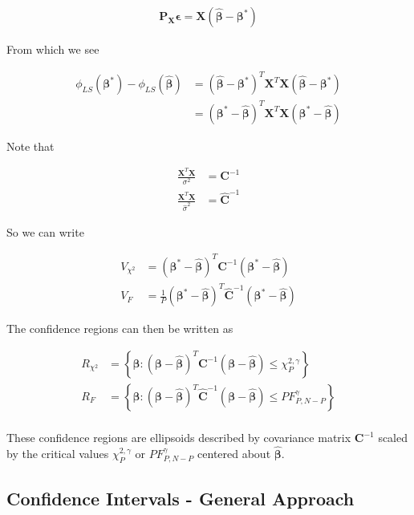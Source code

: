 \documentclass[12pt]{article}
\newcommand{\ep}{\epsilon}
\newcommand{\bv}[1]{\boldsymbol{#1}}
\begin{document}
\begin{align}
\bv{P_X}\bv{\ep} = \bv{X}(\bv{\hat{\beta}} - \bv{\beta^*})
\end{align}

From which we see

\begin{align}
\phi_{LS}(\bv{\beta^*}) - \phi_{LS}(\bv{\hat{\beta}})  &= \left(\bv{\hat{\beta}} - \bv{\beta^*}\right)^T \bv{X}^T\bv{X} \left(\bv{\hat{\beta}} - \bv{\beta^*}\right)\\
&=\left(\bv{\beta^*} - \bv{\hat{\beta}}\right)^T \bv{X}^T\bv{X} \left(\bv{\beta^*} - \bv{\hat{\beta}}\right)
\end{align}

Note that

\begin{align}
\frac{\bv{X}^T\bv{X}}{\sigma^2} &= \bv{C}^{-1}\\
\frac{\bv{X}^T\bv{X}}{\hat{\sigma}^2} &= \bv{\hat{C}}^{-1}
\end{align}

So we can write

\begin{align}
V_{\chi^2} &= \left(\bv{\beta^*} - \bv{\hat{\beta}}\right)^T\bv{C}^{-1}\left(\bv{\beta^*} - \bv{\hat{\beta}}\right)\\
V_{F} &= \frac{1}{P}\left(\bv{\beta^*} - \bv{\hat{\beta}}\right)^T\bv{\hat{C}}^{-1}\left(\bv{\beta^*} - \bv{\hat{\beta}}\right)
\end{align}

The confidence regions can then be written as

\begin{align}
R_{\chi^2} &= \left\{\bv{\beta}: \left(\bv{\beta} - \bv{\hat{\beta}}\right)^T\bv{C}^{-1}\left(\bv{\beta} - \bv{\hat{\beta}}\right) \le \chi^{2,\gamma}_P \right\}\\
R_{F} &= \left\{\bv{\beta}: \left(\bv{\beta} - \bv{\hat{\beta}}\right)^T\bv{\hat{C}}^{-1}\left(\bv{\beta} - \bv{\hat{\beta}}\right) \le PF_{P,N-P}^{\gamma} \right\}\\
\end{align}

These confidence regions are ellipsoids described by covariance matrix $\bv{C}^{-1}$ scaled by the critical values $\chi^{2,\gamma}_P$ or $PF_{P,N-P}^{\gamma}$ centered about $\bv{\hat{\beta}}$.

\subsection{Confidence Intervals - General Approach}
\end{document}
